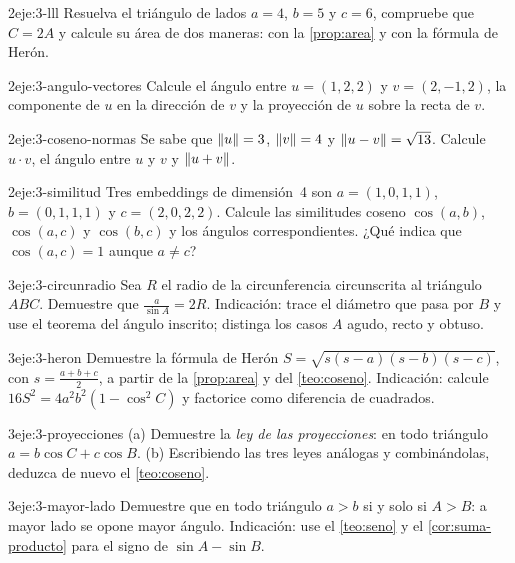 \begin{ejercicio}{2}{eje:3-lll}
Resuelva el triángulo de lados $a=4$, $b=5$ y $c=6$, compruebe que $C=2A$ y calcule su área de dos maneras: con la \cref{prop:area} y con la fórmula de Herón.
\end{ejercicio}

\begin{ejercicio}{2}{eje:3-angulo-vectores}
Calcule el ángulo entre $u=(1,2,2)$ y $v=(2,-1,2)$, la componente de $u$ en la dirección de $v$ y la proyección de $u$ sobre la recta de $v$.
\end{ejercicio}

\begin{ejercicio}{2}{eje:3-coseno-normas}
Se sabe que $\lVert u\rVert=3$, $\lVert v\rVert=4$ y $\lVert u-v\rVert=\sqrt{13}$. Calcule $u\cdot v$, el ángulo entre $u$ y $v$ y $\lVert u+v\rVert$.
\end{ejercicio}

\begin{ejercicio}{2}{eje:3-similitud}
Tres embeddings de dimensión~4 son $a=(1,0,1,1)$, $b=(0,1,1,1)$ y $c=(2,0,2,2)$. Calcule las similitudes coseno $\cos(a,b)$, $\cos(a,c)$ y $\cos(b,c)$ y los ángulos correspondientes. ¿Qué indica que $\cos(a,c)=1$ aunque $a\ne c$?
\end{ejercicio}

\begin{ejercicio}{3}{eje:3-circunradio}
Sea $R$ el radio de la circunferencia circunscrita al triángulo $ABC$. Demuestre que $\frac{a}{\sin A}=2R$. Indicación: trace el diámetro que pasa por $B$ y use el teorema del ángulo inscrito; distinga los casos $A$ agudo, recto y obtuso.
\end{ejercicio}

\begin{ejercicio}{3}{eje:3-heron}
Demuestre la fórmula de Herón $S=\sqrt{s(s-a)(s-b)(s-c)}$, con $s=\frac{a+b+c}{2}$, a partir de la \cref{prop:area} y del \cref{teo:coseno}. Indicación: calcule $16S^{2}=4a^{2}b^{2}(1-\cos^{2}C)$ y factorice como diferencia de cuadrados.
\end{ejercicio}

\begin{ejercicio}{3}{eje:3-proyecciones}
(a) Demuestre la \emph{ley de las proyecciones}: en todo triángulo $a=b\cos C+c\cos B$. (b) Escribiendo las tres leyes análogas y combinándolas, deduzca de nuevo el \cref{teo:coseno}.
\end{ejercicio}

\begin{ejercicio}{3}{eje:3-mayor-lado}
Demuestre que en todo triángulo $a>b$ si y solo si $A>B$: a mayor lado se opone mayor ángulo. Indicación: use el \cref{teo:seno} y el \cref{cor:suma-producto} para el signo de $\sin A-\sin B$.
\end{ejercicio}
